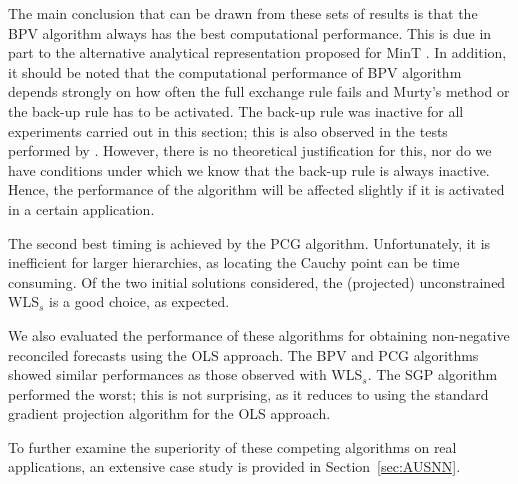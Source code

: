 \documentclass[11pt]{article}
\newcommand{\0}{\phantom{0}}
\begin{document}
The main conclusion that can be drawn from these sets of results is that the BPV algorithm always has the best computational performance. This is due in part to the alternative analytical representation proposed for MinT \citep{Wick2018}. In addition, it should be noted that the computational performance of BPV algorithm depends strongly on how often the full exchange rule fails and Murty's method or the back-up rule has to be activated. The back-up rule was inactive for all experiments carried out in this section; this is also observed in the tests performed by \citet{Kim2011}. However, there is no theoretical justification for this, nor do we have conditions under which we know that the back-up rule is always inactive. Hence, the performance of the algorithm will be affected slightly if it is activated in a certain application.

The second best timing is achieved by the PCG algorithm. Unfortunately, it is inefficient for larger hierarchies, as locating the Cauchy point can be time consuming. Of the two initial solutions considered, the (projected) unconstrained WLS$_s$ is a good choice, as expected.

We also evaluated the performance of these algorithms for obtaining non-negative reconciled forecasts using the OLS approach. The BPV and PCG algorithms showed similar performances as those  observed with WLS$_s$. The SGP algorithm performed the worst; this is not surprising, as it reduces to using the standard gradient projection algorithm for the OLS approach.

To further examine the superiority of these competing algorithms on real applications, an extensive case study is provided in Section~\ref{sec:AUSNN}.
\end{document}

